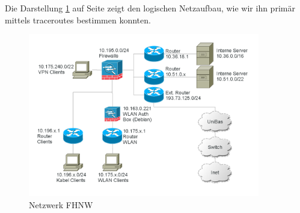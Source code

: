 \documentclass[a4paper,11pt]{scrartcl}
\begin{document}
Die Darstellung \ref{fig:netzplan} auf Seite \pageref{fig:netzplan} zeigt den logischen Netzaufbau, wie wir ihn primär mittels traceroutes bestimmen konnten.
\begin{figure}[h]
	\centering
	\includegraphics[width=0.9\textwidth]{../aufg5/netzplan.png}
	\caption{Netzwerk FHNW}
	\label{fig:netzplan}
\end{figure}
\end{document}
